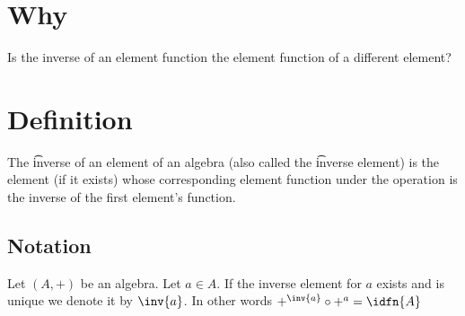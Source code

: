 
\section*{Why}

Is the inverse of an element function the element function of a different element?

\section*{Definition}

The \t{inverse} of an element of an algebra (also called the \t{inverse element}) is the element (if it exists) whose corresponding element function under the operation is the inverse of the first element's function.

\subsection*{Notation}

Let $(A, +)$ be an algebra.
Let $a \in A$.
If the inverse element for $a$ exists and is unique we denote it by $\inv{a}$.
In other words $+^{\inv{a}} \circ +^{a} = \idfn{A}$

\blankpage